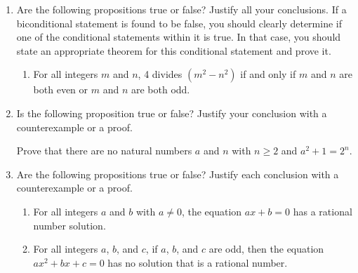 \begin{enumerate}
\item 
Are the following propositions true or false?  Justify all your conclusions.  If a biconditional statement is found to be false, you should clearly determine if one of the conditional statements within it is true.  In that case, you should state an appropriate theorem for this conditional statement and prove it.
\label{exer:sec34-6}%
\begin{enumerate}
\yitem For all integers $m$ and $n$, $m$  and  $n$  are consecutive integers if and only if  4  divides $\left( {m^2  + n^2  - 1} \right)$.
\item For all integers $m$ and $n$, 4 divides $\left( m^2 - n^2 \right) $ if and only if 
$m$ and $n$ are both even or $m$ and $n$ are both odd.
\end{enumerate}


\item Is the following proposition true or false?  Justify your conclusion with a counterexample or a proof.
\label{exer:sec34-nsquared}%



\xitem Prove that there are no natural numbers $a$ and $n$ with $n \geq 2$ and 
$a^2 + 1 = 2^n$.\label{exer:a2plus1not2n}%

\item Are the following propositions true or false?  Justify each conclusion with a counterexample or a proof.
\begin{enumerate}
\item For all integers $a$ and $b$ with $a \ne 0$, the equation $ax + b = 0$ has a rational number solution.

\item For all integers $a$, $b$, and $c$, if $a$, $b$, and $c$ are odd, then the equation 
$ax^2 + bx + c = 0$ has no solution that is a rational number.


\end{enumerate}
\end{enumerate}
